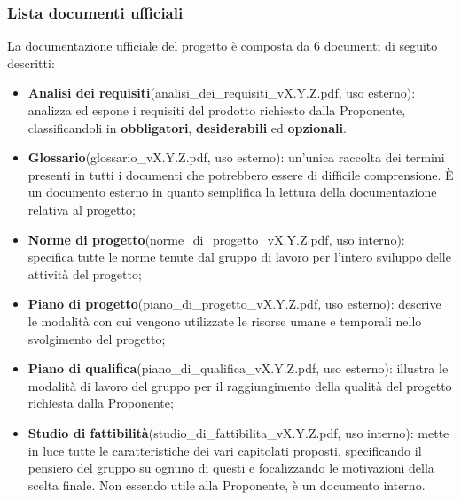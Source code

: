 	\subsubsection{Lista documenti ufficiali}
	La documentazione ufficiale del progetto è composta da 6 documenti di seguito descritti:
	\begin{itemize}
		\item \textbf{Analisi dei requisiti}(analisi\_dei\_requisiti\_vX.Y.Z.pdf, uso esterno): analizza ed espone i requisiti del prodotto richiesto dalla Proponente, classificandoli in \textbf{obbligatori}, \textbf{desiderabili} ed \textbf{opzionali}.
		\item \textbf{Glossario}(glossario\_vX.Y.Z.pdf, uso esterno): un'unica raccolta dei termini presenti in tutti i documenti che potrebbero essere di difficile comprensione. È un documento esterno in quanto semplifica la lettura della documentazione relativa al progetto;
		\item \textbf{Norme di progetto}(norme\_di\_progetto\_vX.Y.Z.pdf, uso interno): specifica tutte le norme tenute dal gruppo di lavoro per l'intero sviluppo delle attività del progetto;
		\item \textbf{Piano di progetto}(piano\_di\_progetto\_vX.Y.Z.pdf, uso esterno): descrive le modalità con cui vengono utilizzate le risorse umane e temporali nello svolgimento del progetto;
		\item \textbf{Piano di qualifica}(piano\_di\_qualifica\_vX.Y.Z.pdf, uso esterno): illustra le modalità di lavoro del gruppo per il raggiungimento della qualità del progetto richiesta dalla Proponente;
		\item \textbf{Studio di fattibilità}(studio\_di\_fattibilita\_vX.Y.Z.pdf, uso interno): mette in luce tutte le caratteristiche dei vari capitolati proposti, specificando il pensiero del gruppo su ognuno di questi e focalizzando le motivazioni della scelta finale. Non essendo utile alla Proponente, è un documento interno.
	\end{itemize}

